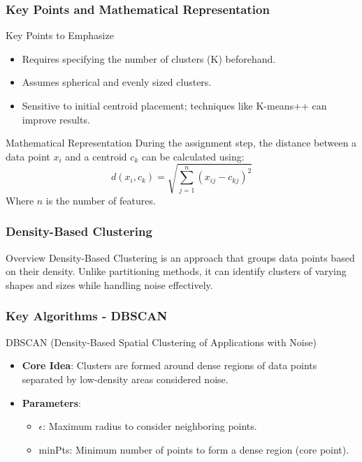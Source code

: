 \documentclass{beamer}
\begin{document}
\begin{frame}[fragile]
    \frametitle{Key Points and Mathematical Representation}
    \begin{block}{Key Points to Emphasize}
        \begin{itemize}
            \item Requires specifying the number of clusters (K) beforehand.
            \item Assumes spherical and evenly sized clusters.
            \item Sensitive to initial centroid placement; techniques like K-means++ can improve results.
        \end{itemize}
    \end{block}
    
    \begin{block}{Mathematical Representation}
        During the assignment step, the distance between a data point \( x_i \) and a centroid \( c_k \) can be calculated using:
        \begin{equation}
            d(x_i, c_k) = \sqrt{\sum_{j=1}^{n} (x_{ij} - c_{kj})^2}
        \end{equation}
        Where \( n \) is the number of features.
    \end{block}
\end{frame}

\begin{frame}[fragile]
    \frametitle{Density-Based Clustering}
    \begin{block}{Overview}
        Density-Based Clustering is an approach that groups data points based on their density. Unlike partitioning methods, it can identify clusters of varying shapes and sizes while handling noise effectively.
    \end{block}
\end{frame}

\begin{frame}[fragile]
    \frametitle{Key Algorithms - DBSCAN}
    \begin{block}{DBSCAN (Density-Based Spatial Clustering of Applications with Noise)}
        \begin{itemize}
            \item \textbf{Core Idea}: Clusters are formed around dense regions of data points separated by low-density areas considered noise.
            \item \textbf{Parameters}:
                \begin{itemize}
                    \item $\epsilon$: Maximum radius to consider neighboring points.
                    \item minPts: Minimum number of points to form a dense region (core point).
                \end{itemize}
        \end{itemize}
    \end{block}
\end{frame}
\end{document}
